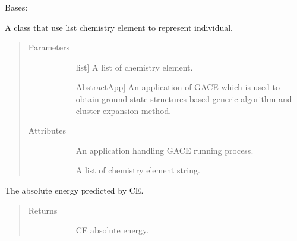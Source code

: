 \documentclass[letterpaper,10pt,english]{sphinxmanual}
\begin{document}
\begin{fulllineitems}
\label{\detokenize{pygace:pygace.utility.EleIndv}}
Bases: 

A class that use list chemistry element to represent individual.
\begin{quote}\begin{description}
\item[{Parameters}] \leavevmode\begin{description}
\item[{}] \leavevmode{[}list{]}
A list of chemistry element.

\item[{}] \leavevmode{[}AbstractApp{]}
An application of GACE which is used to obtain ground-state
structures based generic algorithm and cluster expansion method.

\end{description}

\item[{Attributes}] \leavevmode\begin{description}
\item[{}] \leavevmode
An application handling GACE running process.

\item[{}] \leavevmode
A list of chemistry element string.

\end{description}

\end{description}\end{quote}

\begin{fulllineitems}
\label{\detokenize{pygace:pygace.utility.EleIndv.ce_energy}}
The absolute energy predicted by CE.
\begin{quote}\begin{description}
\item[{Returns}] \leavevmode\begin{description}
\item[{}] \leavevmode
CE absolute energy.

\end{description}


\end{description}
\end{quote}
\end{fulllineitems}
\end{fulllineitems}
\end{document}
